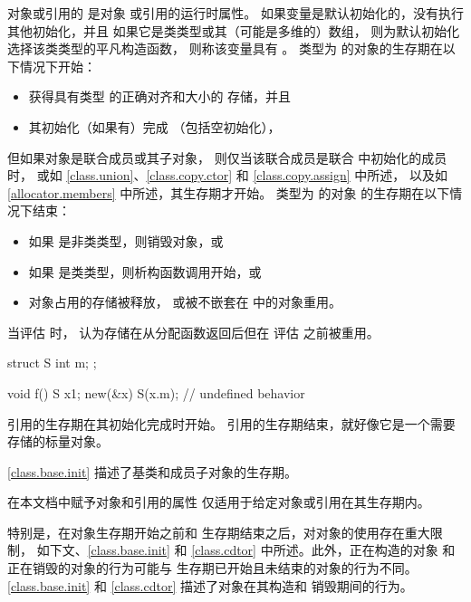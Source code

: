\pnum
{}%
对象或引用的  是对象
或引用的运行时属性。
如果变量是默认初始化的，没有执行其他初始化，并且
如果它是类类型或其（可能是多维的）数组，
则为默认初始化选择该类类型的平凡构造函数，
则称该变量具有 。
类型为  的对象的生存期在以下情况下开始：
\begin{itemize}
\item 获得具有类型  的正确对齐和大小的
  存储，并且
\item 其初始化（如果有）完成
  （包括空初始化），
\end{itemize}
但如果对象是联合成员或其子对象，
则仅当该联合成员是联合 中初始化的成员时，
或如
\ref{class.union}、\ref{class.copy.ctor} 和 \ref{class.copy.assign} 中所述，
以及如 \ref{allocator.members} 中所述，其生存期才开始。
类型为  的对象  的生存期在以下情况下结束：
\begin{itemize}
\item 如果  是非类类型，则销毁对象，或
\item 如果  是类类型，则析构函数调用开始，或
\item 对象占用的存储被释放，
或被不嵌套在  中的对象重用。
\end{itemize}
当评估  时，
认为存储在从分配函数返回后但在
评估  之前被重用。
\begin{example}
\begin{codeblock}
struct S {
  int m;
};

void f() {
  S x{1};
  new(&x) S(x.m);   // undefined behavior
}
\end{codeblock}
\end{example}

\pnum
{}%
引用的生存期在其初始化完成时开始。
引用的生存期结束，就好像它是一个需要存储的标量对象。

\pnum
\begin{note}
\ref{class.base.init}
描述了基类和成员子对象的生存期。
\end{note}

\pnum
在本文档中赋予对象和引用的属性
仅适用于给定对象或引用在其生存期内。
\begin{note}
特别是，在对象生存期开始之前和
生存期结束之后，对对象的使用存在重大限制，
如下文、\ref{class.base.init} 和
\ref{class.cdtor} 中所述。此外，正在构造的对象
和正在销毁的对象的行为可能与
生存期已开始且未结束的对象的行为不同。\ref{class.base.init}
和 \ref{class.cdtor} 描述了对象在其构造和
销毁期间的行为。
\end{note}

